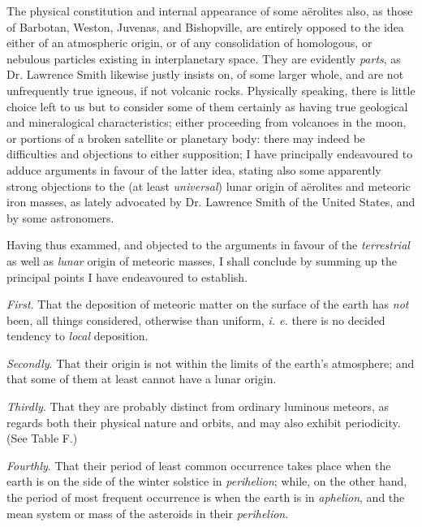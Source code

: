 \documentclass[a4paper, 12pt, oneside]{article}
\begin{document}
The physical constitution and internal appearance of some aërolites also, as those of Barbotan, Weston, Juvenas, and Bishopville, are entirely opposed to the idea either of an atmospheric origin, or of any consolidation of homologous, or nebulous particles existing in interplanetary space. They are evidently \emph{parts}, as Dr. Lawrence Smith likewise justly insists on, of some larger whole, and are not unfrequently true igneous, if not volcanic rocks. Physically speaking, there is little choice left to us but to consider some of them certainly as having true geological and mineralogical characteristics; either proceeding from volcanoes in the moon, or portions of a broken satellite or planetary body: there may indeed be difficulties and objections to either supposition; I have principally endeavoured to adduce arguments in favour of the latter idea, stating also some apparently strong objections to the (at least \emph{universal}) lunar origin of aërolites and meteoric iron masses, as lately advocated by Dr. Lawrence Smith of the United States, and by some astronomers.

Having thus exammed, and objected to the arguments in favour of the \emph{terrestrial} as well as \emph{lunar} origin of meteoric masses, I shall conclude by summing up the principal points I have endeavoured to establish.

\emph{First}. That the deposition of meteoric matter on the surface of the earth has \emph{not} been, all things considered, otherwise than uniform, \emph{i. e.} there is no decided tendency to \emph{local} deposition.

\emph{Secondly}. That their origin is not within the limits of the earth's atmosphere; and that some of them at least cannot have a lunar origin.

\emph{Thirdly}. That they are probably distinct from ordinary luminous meteors, as regards both their physical nature and orbits, and may also exhibit periodicity. (See Table F.)

\emph{Fourthly}. That their period of least common occurrence takes place when the earth is on the side of the winter solstice in \emph{perihelion}; while, on the other hand, the period of most frequent occurrence is when the earth is in \emph{aphelion}, and the mean system or mass of the asteroids in their \emph{perihelion}.
\end{document}
